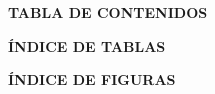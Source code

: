 \break

\medspace
\vspace{1.5cm}
\begin{center} %
	\thispagestyle{empty} %
	\renewcommand*\contentsname{} %
	\textbf{\large TABLA DE CONTENIDOS}
	\vspace{-1cm}
	\tableofcontents
\end{center}


\break

\medspace
\vspace{1.5cm}
\begin{center}
	\thispagestyle{empty}
	\renewcommand{\listtablename}{}
	\textbf{\large ÍNDICE DE TABLAS}
	\vspace{-1cm}
	\listoftables
\end{center}




\break

\medspace
\vspace{1.5cm}
\begin{center}
	\thispagestyle{empty}
	\renewcommand{\listfigurename}{}
	\textbf{\large ÍNDICE DE FIGURAS}
	\vspace{-1cm}
	\listoffigures
\end{center}
